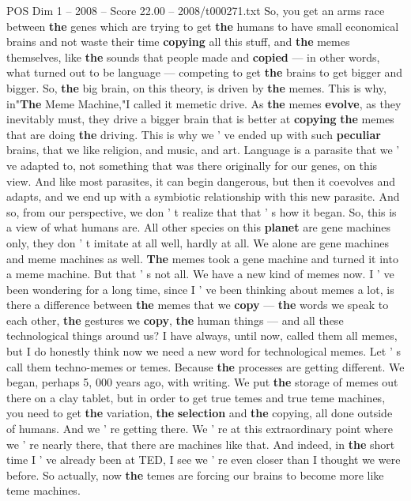\begin{textsample}{POS Dim 1 – 2008 – Score 22.00 – 2008/t000271.txt}
So, you get an arms race between \textbf{the} genes which are trying to get \textbf{the} humans to have small economical brains and not waste their time \textbf{copying} all this stuff, and \textbf{the} memes themselves, like \textbf{the} sounds that people made and \textbf{copied} — in other words, what turned out to be language — competing to get \textbf{the} brains to get bigger and bigger.
So, \textbf{the} big brain, on this theory, is driven by \textbf{the} memes.
This is why, in"\textbf{The} Meme Machine,"I called it memetic drive.
As \textbf{the} memes \textbf{evolve}, as they inevitably must, they drive a bigger brain that is better at \textbf{copying} \textbf{the} memes that are doing \textbf{the} driving.
This is why we ' ve ended up with such \textbf{peculiar} brains, that we like religion, and music, and art.
Language is a parasite that we ' ve adapted to, not something that was there originally for our genes, on this view.
And like most parasites, it can begin dangerous, but then it coevolves and adapts, and we end up with a symbiotic relationship with this new parasite.
And so, from our perspective, we don ' t realize that that ' s how it began.
So, this is a view of what humans are.
All other species on this \textbf{planet} are gene machines only, they don ' t imitate at all well, hardly at all.
We alone are gene machines and meme machines as well. \textbf{The} memes took a gene machine and turned it into a meme machine.
But that ' s not all.
We have a new kind of memes now.
I ' ve been wondering for a long time, since I ' ve been thinking about memes a lot, is there a difference between \textbf{the} memes that we \textbf{copy} — \textbf{the} words we speak to each other, \textbf{the} gestures we \textbf{copy}, \textbf{the} human things — and all these technological things around us?
I have always, until now, called them all memes, but I do honestly think now we need a new word for technological memes.
Let ' s call them techno-memes or temes.
Because \textbf{the} processes are getting different.
We began, perhaps 5, 000 years ago, with writing.
We put \textbf{the} storage of memes out there on a clay tablet, but in order to get true temes and true teme machines, you need to get \textbf{the} variation, \textbf{the} \textbf{selection} and \textbf{the} copying, all done outside of humans.
And we ' re getting there.
We ' re at this extraordinary point where we ' re nearly there, that there are machines like that.
And indeed, in \textbf{the} short time I ' ve already been at TED, I see we ' re even closer than I thought we were before.
So actually, now \textbf{the} temes are forcing our brains to become more like teme machines.

\end{textsample}
